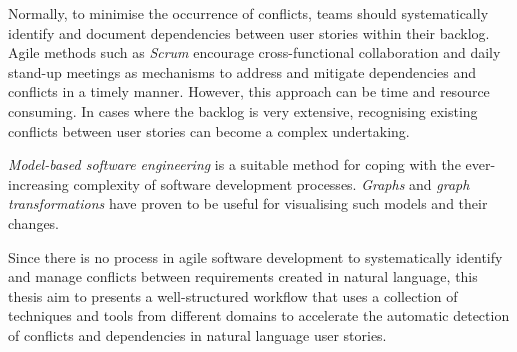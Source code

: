 Normally, to minimise the occurrence of conflicts, teams should systematically identify and document dependencies between user stories within their backlog. Agile methods such as \emph{Scrum} encourage cross-functional collaboration and daily stand-up meetings as mechanisms to address and mitigate dependencies and conflicts in a timely manner. However, this approach can be time and resource consuming. In cases where the backlog is very extensive, recognising existing conflicts between user stories can become a complex undertaking.

\emph{Model-based software engineering} is a suitable method for coping with the ever-increasing complexity of software development processes. \emph{Graphs} and \emph{graph transformations} have proven to be useful for visualising such models and their changes.

Since there is no process in agile software development to systematically identify and manage conflicts between requirements created in natural language, this thesis aim to presents a well-structured workflow that uses a collection of techniques and tools from different domains to accelerate the automatic detection of conflicts and dependencies in natural language user stories.